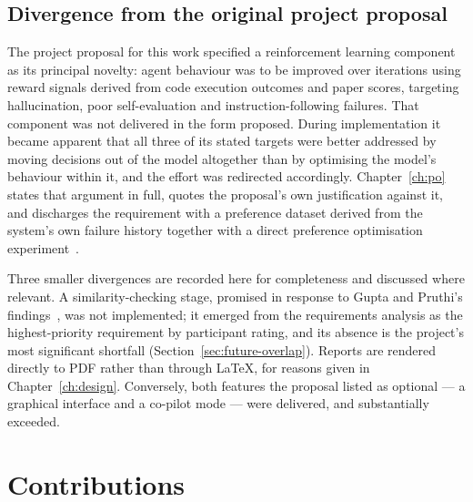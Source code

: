 \subsection{Divergence from the original project proposal}
\label{sec:divergence}

The project proposal for this work specified a reinforcement learning component as its
principal novelty: agent behaviour was to be improved over iterations using reward signals
derived from code execution outcomes and paper scores, targeting hallucination, poor
self-evaluation and instruction-following failures. That component was not delivered in the
form proposed. During implementation it became apparent that all three of its stated targets
were better addressed by moving decisions out of the model altogether than by optimising the
model's behaviour within it, and the effort was redirected accordingly.
Chapter~\ref{ch:po} states that argument in full, quotes the proposal's own justification
against it, and discharges the requirement with a preference dataset derived from the
system's own failure history together with a direct preference optimisation
experiment~\cite{rafailov2023dpo}.

Three smaller divergences are recorded here for completeness and discussed where relevant.
A similarity-checking stage, promised in response to Gupta and Pruthi's
findings~\cite{gupta2025glitters}, was not implemented; it emerged from the requirements
analysis as the highest-priority requirement by participant rating, and its absence is the
project's most significant shortfall (Section~\ref{sec:future-overlap}). Reports are rendered
directly to PDF rather than through LaTeX, for reasons given in Chapter~\ref{ch:design}.
Conversely, both features the proposal listed as optional --- a graphical interface and a
co-pilot mode --- were delivered, and substantially exceeded.

\section{Contributions}
\label{sec:contributions}

